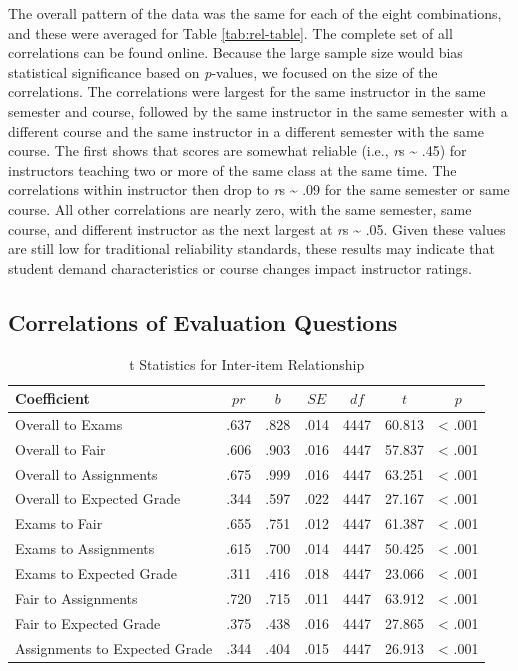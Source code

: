 \documentclass[,man]{apa6}
\theoremstyle{definition}
\theoremstyle{definition}
\theoremstyle{definition}
\theoremstyle{remark}
\begin{document}
The overall pattern of the data was the same for each of the eight
combinations, and these were averaged for Table \ref{tab:rel-table}. The
complete set of all correlations can be found online. Because the large
sample size would bias statistical significance based on
\emph{p}-values, we focused on the size of the correlations. The
correlations were largest for the same instructor in the same semester
and course, followed by the same instructor in the same semester with a
different course and the same instructor in a different semester with
the same course. The first shows that scores are somewhat reliable
(i.e., \emph{r}s \textasciitilde{} .45) for instructors teaching two or
more of the same class at the same time. The correlations within
instructor then drop to \emph{r}s \textasciitilde{} .09 for the same
semester or same course. All other correlations are nearly zero, with
the same semester, same course, and different instructor as the next
largest at \emph{r}s \textasciitilde{} .05. Given these values are still
low for traditional reliability standards, these results may indicate
that student demand characteristics or course changes impact instructor
ratings.

\hypertarget{correlations-of-evaluation-questions}{%
\subsection{Correlations of Evaluation
Questions}\label{correlations-of-evaluation-questions}}

\begin{table}[tbp]
\begin{center}
\begin{threeparttable}
\caption{\label{tab:correlation-table}t Statistics for Inter-item Relationship}
\begin{tabular}{lcccccc}
\toprule
Coefficient & $pr$ & $b$ & $SE$ & $df$ & $t$ & $p$\\
\midrule
Overall to Exams & .637 & .828 & .014 & 4447 & 60.813 & < .001\\
Overall to Fair & .606 & .903 & .016 & 4447 & 57.837 & < .001\\
Overall to Assignments & .675 & .999 & .016 & 4447 & 63.251 & < .001\\
Overall to Expected Grade & .344 & .597 & .022 & 4447 & 27.167 & < .001\\
Exams to Fair & .655 & .751 & .012 & 4447 & 61.387 & < .001\\
Exams to Assignments & .615 & .700 & .014 & 4447 & 50.425 & < .001\\
Exams to Expected Grade & .311 & .416 & .018 & 4447 & 23.066 & < .001\\
Fair to Assignments & .720 & .715 & .011 & 4447 & 63.912 & < .001\\
Fair to Expected Grade & .375 & .438 & .016 & 4447 & 27.865 & < .001\\
Assignments to Expected Grade & .344 & .404 & .015 & 4447 & 26.913 & < .001\\
\bottomrule
\end{tabular}
\end{threeparttable}
\end{center}
\end{table}
\end{document}
